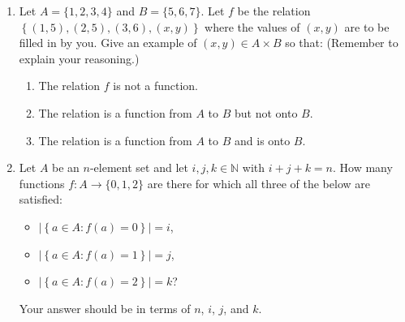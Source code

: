 \documentclass{article}
\theoremstyle{definition}
\begin{document}
\begin{question}{5}
    \begin{enumerate}
        \item Let \(A = \{1,2,3,4\}\) and \(B = \{5,6,7\}\).
        Let \(f\) be the relation \( \left\{(1,5),(2,5),(3,6),(x, y)\right\} \) where the values of $(x, y)$ are to be filled in by you. 
        Give an example of \((x, y) \in A \times B\) so that: (Remember to explain your reasoning.)
            \begin{enumerate}
                \item The relation \(f\) is not a function.
                \item The relation is a function from \(A\) to \(B\) but not onto \(B\).
                \item The relation is a function from \(A\) to \(B\) and is onto \(B\).
            \end{enumerate}

        \item     Let \(A\) be an \(n\)-element set and let \(i, j, k \in \mathbb{N}\) with \(i+j+k = n\).
        How many functions \(f \colon A \to \{0,1,2\}\) are there for which all three of the below are satisfied:
            \begin{itemize}
                \item \(\left|\left\{ a \in A : f(a) = 0 \right\} \right| = i\),
                \item \(\left|\left\{ a \in A : f(a) = 1 \right\} \right| = j\),
                \item \(\left|\left\{ a \in A : f(a) = 2 \right\} \right| = k\)?
            \end{itemize}
            Your answer should be in terms of \(n\), \(i\), \(j\), and \(k\).
    \end{enumerate}
\end{question}
\end{document}
